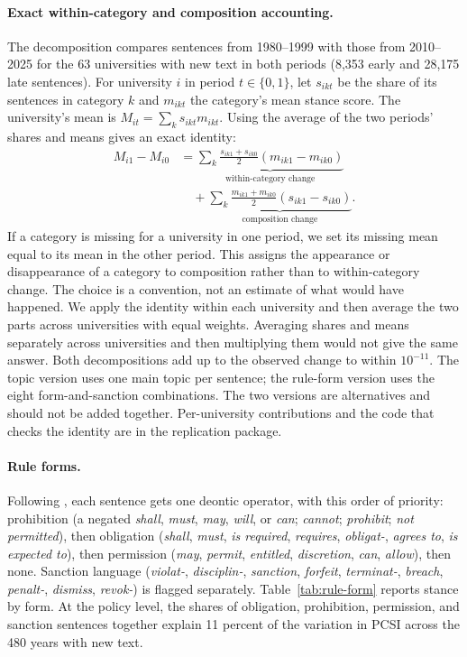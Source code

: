 \documentclass[11pt]{article}
\begin{document}
\paragraph{Exact within-category and composition accounting.} The decomposition compares sentences from 1980--1999 with those from 2010--2025 for the 63 universities with new text in both periods (8,353 early and 28,175 late sentences). For university $i$ in period $t\in\{0,1\}$, let $s_{ikt}$ be the share of its sentences in category $k$ and $m_{ikt}$ the category's mean stance score. The university's mean is $M_{it}=\sum_k s_{ikt}m_{ikt}$. Using the average of the two periods' shares and means gives an exact identity:
\begin{equation}\begin{split}
M_{i1}-M_{i0}
&= \underbrace{\sum_k \frac{s_{ik1}+s_{ik0}}{2}(m_{ik1}-m_{ik0})}_{\text{within-category change}}\\[2pt]
&\quad+\underbrace{\sum_k \frac{m_{ik1}+m_{ik0}}{2}(s_{ik1}-s_{ik0})}_{\text{composition change}}.
\end{split}\end{equation}
If a category is missing for a university in one period, we set its missing mean equal to its mean in the other period. This assigns the appearance or disappearance of a category to composition rather than to within-category change. The choice is a convention, not an estimate of what would have happened. We apply the identity within each university and then average the two parts across universities with equal weights. Averaging shares and means separately across universities and then multiplying them would not give the same answer. Both decompositions add up to the observed change to within $10^{-11}$. The topic version uses one main topic per sentence; the rule-form version uses the eight form-and-sanction combinations. The two versions are alternatives and should not be added together. Per-university contributions and the code that checks the identity are in the replication package.



\paragraph{Rule forms.} Following \citet{crawford1995grammar}, each sentence gets one deontic operator, with this order of priority: prohibition (a negated \emph{shall}, \emph{must}, \emph{may}, \emph{will}, or \emph{can}; \emph{cannot}; \emph{prohibit}; \emph{not permitted}), then obligation (\emph{shall}, \emph{must}, \emph{is required}, \emph{requires}, \emph{obligat-}, \emph{agrees to}, \emph{is expected to}), then permission (\emph{may}, \emph{permit}, \emph{entitled}, \emph{discretion}, \emph{can}, \emph{allow}), then none. Sanction language (\emph{violat-}, \emph{disciplin-}, \emph{sanction}, \emph{forfeit}, \emph{terminat-}, \emph{breach}, \emph{penalt-}, \emph{dismiss}, \emph{revok-}) is flagged separately. Table~\ref{tab:rule-form} reports stance by form. At the policy level, the shares of obligation, prohibition, permission, and sanction sentences together explain 11 percent of the variation in PCSI across the 480 years with new text.
\end{document}
